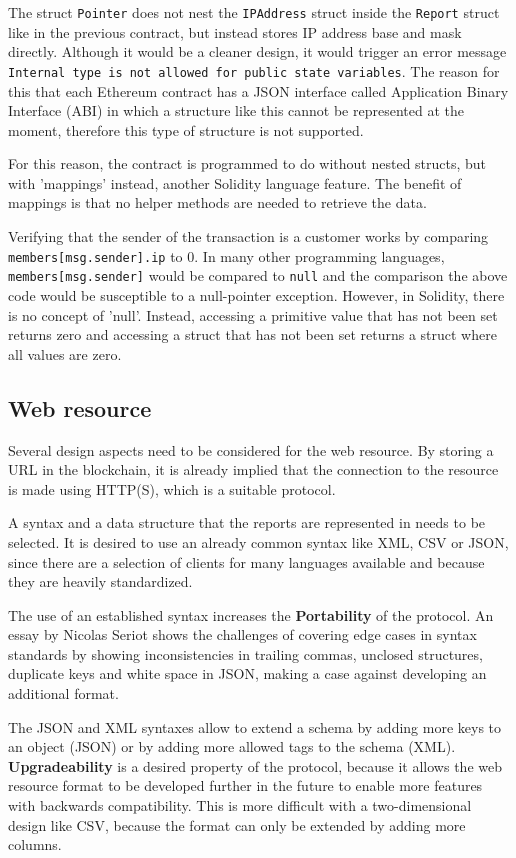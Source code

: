 The struct \texttt{Pointer} does not nest the \texttt{IPAddress} struct inside the \texttt{Report} struct like in the previous contract, but instead stores IP address base and mask directly. Although it would be a cleaner design, it would trigger an error message \texttt{Internal type is not allowed for public state variables}. The reason for this that each Ethereum contract has a JSON interface called Application Binary Interface (ABI) in which a structure like this cannot be represented at the moment, therefore this type of structure is not supported.

For this reason, the contract is programmed to do without nested structs, but with 'mappings' instead, another Solidity language feature. The benefit of mappings is that no helper methods are needed to retrieve the data.

Verifying that the sender of the transaction is a customer works by comparing \texttt{members[msg.sender].ip} to 0. In many other programming languages, \texttt{members[msg.sender]} would be compared to \texttt{null} and the comparison the above code would be susceptible to a null-pointer exception. However, in Solidity, there is no concept of 'null'. Instead, accessing a primitive value that has not been set returns zero and accessing a struct that has not been set returns a struct where all values are zero.

\subsection{Web resource}
Several design aspects need to be considered for the web resource. By storing a URL in the blockchain, it is already implied that the connection to the resource is made using HTTP(S), which is a suitable protocol.

A syntax and a data structure that the reports are represented in needs to be selected. It is desired to use an already common syntax like XML, CSV or JSON, since there are a selection of clients for many languages available and because they are heavily standardized.

The use of an established syntax increases the \textbf{Portability} of the protocol. An essay by Nicolas Seriot \cite{ParsingJSON} shows the challenges of covering edge cases in syntax standards by showing inconsistencies in trailing commas, unclosed structures, duplicate keys and white space in JSON, making a case against developing an additional format.

The JSON and XML syntaxes allow to extend a schema by adding more keys to an object (JSON) or by adding more allowed tags to the schema (XML). \textbf{Upgradeability} is a desired property of the protocol, because it allows the web resource format to be developed further in the future to enable more features with backwards compatibility. This is more difficult with a two-dimensional design like CSV, because the format can only be extended by adding more columns.

